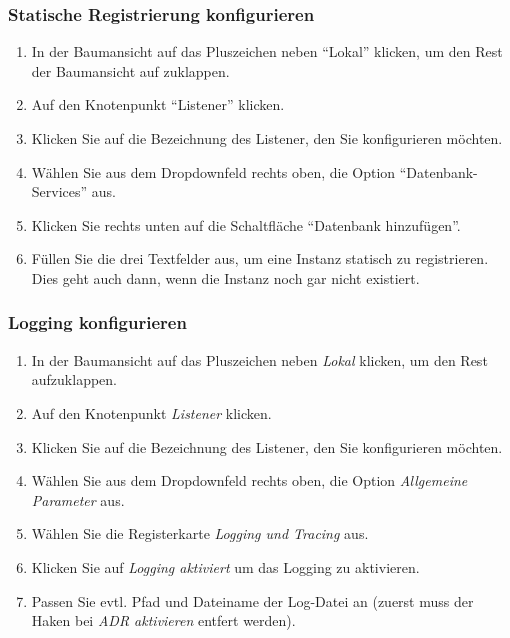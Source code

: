         \subsubsection{Statische Registrierung konfigurieren}
          \begin{enumerate}
            \item In der Baumansicht auf das Pluszeichen neben \enquote{Lokal} klicken, um den Rest der Baumansicht auf zuklappen.
            \item Auf den Knotenpunkt \enquote{Listener} klicken.
            \item Klicken Sie auf die Bezeichnung des Listener, den Sie konfigurieren möchten.
\clearpage
            \item Wählen Sie aus dem Dropdownfeld rechts oben, die Option \enquote{Datenbank-Services} aus.
            \item Klicken Sie rechts unten auf die Schaltfläche \enquote{Datenbank hinzufügen}.
            \item Füllen Sie die drei Textfelder aus, um eine Instanz statisch zu registrieren. Dies geht auch dann, wenn die Instanz noch gar nicht existiert.
          \end{enumerate}
        \subsubsection{Logging konfigurieren}
          \begin{enumerate}
            \item In der Baumansicht auf das Pluszeichen neben \textit{Lokal} klicken, um den Rest  aufzuklappen.
            \item Auf den Knotenpunkt \textit{Listener} klicken.
            \item Klicken Sie auf die Bezeichnung des Listener, den Sie konfigurieren möchten.
\clearpage
            \item Wählen Sie aus dem Dropdownfeld rechts oben, die Option \textit{Allgemeine Parameter} aus.
            \item Wählen Sie die Registerkarte \textit{Logging und Tracing} aus.
            \item Klicken Sie auf \textit{Logging aktiviert} um das Logging zu aktivieren.
            \item Passen Sie evtl. Pfad und Dateiname der Log-Datei an (zuerst muss der Haken bei \textit{ADR aktivieren} entfert werden).
          \end{enumerate}
